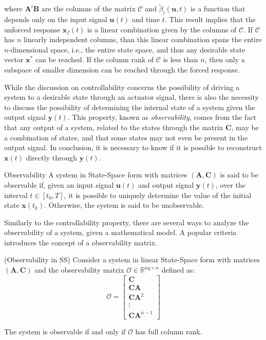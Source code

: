 \documentclass[a4paper,11pt]{book}
\numberwithin{figure}{chapter}
\numberwithin{equation}{chapter}
\numberwithin{table}{chapter}
\newtheorem{theorem}{Theorem}[chapter]
\theoremstyle{definition}
\newtheorem{definition}{Definition}[chapter]
\newcounter{boxed-theorem}
\newenvironment{boxed-theorem}[1]
{\begin{shaded} \begin{theorem}{#1}}
{\end{theorem} \end{shaded}}
\newcounter{boxed-definition}
\newenvironment{boxed-definition}[1]
{\begin{shaded} \begin{definition}{#1}}
{\end{definition} \end{shaded}}
\begin{document}
\noindent where $\bm{A}^i \bm{B}$ are the columns of the matrix $\bm{\mathcal{C}}$ and $\tilde{\beta}_i(\bm{u}, t)$ is a function that depends only on the input signal $\bm{u}(t)$ and time $t$. This result implies that the unforced response $\bm{x}_f(t)$ is a linear combination given by the columns of $\bm{\mathcal{C}}$. If $\bm{\mathcal{C}}$ has $n$ linearly independent columns, than this linear combination spans the entire $n$-dimensional space, i.e., the entire state space, and thus any desirable state vector $\bm{x}^*$ can be reached. If the column rank of $\bm{\mathcal{C}}$ is less than $n$, then only a subspace of smaller dimension can be reached through the forced response.

While the discussion on controllability concerns the possibility of driving a system to a desirable state through an actuator signal, there is also the necessity to discuss the possibility of determining the internal state of a system given the output signal $\bm{y}(t)$. This property, known as \textit{observability}, comes from the fact that any output of a system, related to the states through the matrix $\bm{C}$, may be a combination of states, and that some states may not even be present in the output signal. In conclusion, it is necessary to know if it is possible to reconstruct $\bm{x}(t)$ directly through $\bm{y}(t)$. 

\begin{boxed-definition}{Observability}
	A system in State-Space form with matrices $(\bm{A}, \bm{C})$ is said to be observable if, given an input signal $\bm{u}(t)$ and output signal $\bm{y}(t)$, over the interval $t \in [t_0, T]$, it is possible to uniquely determine the value of the initial state $\bm{x}(t_0)$. Otherwise, the system is said to be unobservable.
\end{boxed-definition}

Similarly to the controllability property, there are several ways to analyze the observability of a system, given a mathematical model. A popular criteria introduces the concept of a observability matrix.

\begin{boxed-theorem}{(Observability in SS)}
	Consider a system in linear State-Space form with matrices $(\bm{A}, \bm{C})$ and the observability matrix $\bm{\mathcal{O}} \in \mathbb{R}^{nq \times n}$ defined as:
	\begin{equation}
		\bm{\mathcal{O}} = \begin{bmatrix} \bm{C} \\ \bm{C} \bm{A} \\ \bm{C} \bm{A}^2 \\ \vdots \\ \bm{C} \bm{A}^{n-1} \end{bmatrix}
	\end{equation}
	
	\noindent The system is observable if and only if $\bm{\mathcal{O}}$ has full column rank.
\end{boxed-theorem}   
\end{document}
